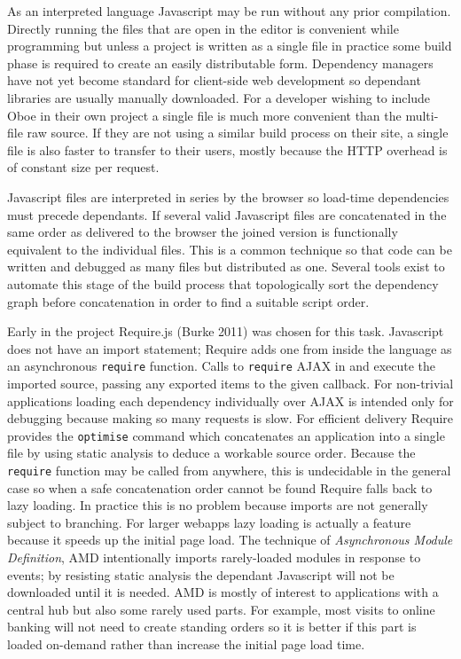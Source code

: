 \documentclass[12pt, ]{article}
\begin{document}
As an interpreted language Javascript may be run without any prior
compilation. Directly running the files that are open in the editor is
convenient while programming but unless a project is written as a single
file in practice some build phase is required to create an easily
distributable form. Dependency managers have not yet become standard for
client-side web development so dependant libraries are usually manually
downloaded. For a developer wishing to include Oboe in their own project
a single file is much more convenient than the multi-file raw source. If
they are not using a similar build process on their site, a single file
is also faster to transfer to their users, mostly because the HTTP
overhead is of constant size per request.

Javascript files are interpreted in series by the browser so load-time
dependencies must precede dependants. If several valid Javascript files
are concatenated in the same order as delivered to the browser the
joined version is functionally equivalent to the individual files. This
is a common technique so that code can be written and debugged as many
files but distributed as one. Several tools exist to automate this stage
of the build process that topologically sort the dependency graph before
concatenation in order to find a suitable script order.

Early in the project Require.js (Burke 2011) was chosen for this task.
Javascript does not have an import statement; Require adds one from
inside the language as an asynchronous \texttt{require} function. Calls
to \texttt{require} AJAX in and execute the imported source, passing any
exported items to the given callback. For non-trivial applications
loading each dependency individually over AJAX is intended only for
debugging because making so many requests is slow. For efficient
delivery Require provides the \texttt{optimise} command which
concatenates an application into a single file by using static analysis
to deduce a workable source order. Because the \texttt{require} function
may be called from anywhere, this is undecidable in the general case so
when a safe concatenation order cannot be found Require falls back to
lazy loading. In practice this is no problem because imports are not
generally subject to branching. For larger webapps lazy loading is
actually a feature because it speeds up the initial page load. The
technique of \emph{Asynchronous Module Definition}, AMD intentionally
imports rarely-loaded modules in response to events; by resisting static
analysis the dependant Javascript will not be downloaded until it is
needed. AMD is mostly of interest to applications with a central hub but
also some rarely used parts. For example, most visits to online banking
will not need to create standing orders so it is better if this part is
loaded on-demand rather than increase the initial page load time.
\end{document}
